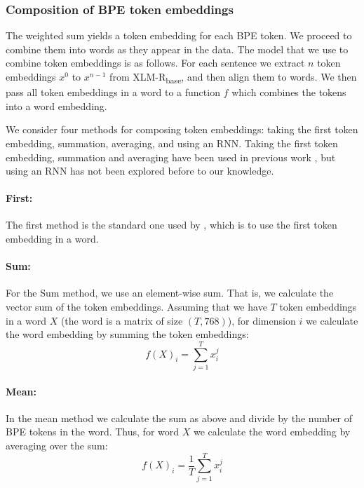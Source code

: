 \documentclass[11pt]{article}
\newcommand\citet{\newcite}
\newcommand\citep{\cite}
\begin{document}
     \subsubsection{Composition of BPE token embeddings}
          The weighted sum yields a token embedding for each BPE token. We
     proceed to combine them into words as they appear in the data.
      The model that we use to combine token embeddings is as
     follows. For each sentence we extract $n$ token embeddings $x^0$ to
     $x^{n-1}$ from XLM-R\textsubscript{base}, and then align them to words.
                    We then pass all token embeddings in a word to a
     function $f$ which combines the tokens into a word embedding.

    We consider four methods for composing token embeddings: taking the first token embedding,
     summation, averaging, and using an RNN. Taking the first token
     embedding, summation and averaging have been used in previous work
     \citep{sachan2020syntax,kondratyuk2019cross,devlin2018bert}, but
     using an RNN has not been explored before to our knowledge.

        \paragraph{First:} The first method is the standard one used by
     \citet{devlin2018bert}, which is to use the first token embedding in a word.
    
             \paragraph{Sum:} For the Sum method, we use an
     element-wise sum. That is, we calculate the vector sum of the
     token embeddings. Assuming that we have $T$ token embeddings in a
     word $X$ (the word is a matrix of size $(T,768)$), for dimension
     $i$ we calculate the word embedding by summing the token
     embeddings:
	\begin{equation}
	f(X)_i = \sum_{j=1}^{T} x_i^j
	\end{equation}

         \paragraph{Mean:} In the mean method we calculate the sum as
     above and divide by the number of BPE tokens in the word. Thus,
     for word $X$ we calculate the word embedding by averaging over
     the sum:
	\begin{equation}
	f(X)_{i} = \frac{1}{T}\sum_{j=1}^{T} x_i^j
	\end{equation}
	
\end{document}
